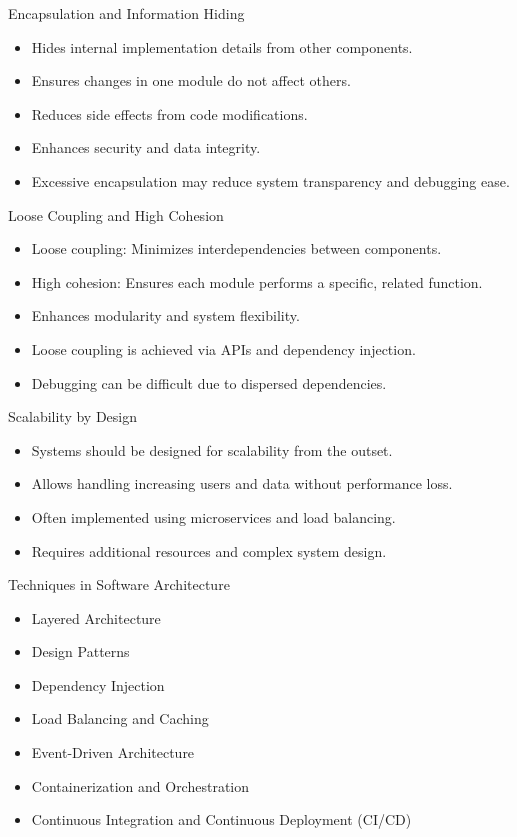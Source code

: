 \documentclass[aspectratio=169, table]{beamer}
\begin{document}
	\begin{frame}{Encapsulation and Information Hiding}
		\begin{itemize}
			\item Hides internal implementation details from other components.
			\item Ensures changes in one module do not affect others.
			\item Reduces side effects from code modifications.
			\item Enhances security and data integrity.
			\item Excessive encapsulation may reduce system transparency and debugging ease.
		\end{itemize}
	\end{frame}
	
	\begin{frame}{Loose Coupling and High Cohesion}
		\begin{itemize}
			\item Loose coupling: Minimizes interdependencies between components.
			\item High cohesion: Ensures each module performs a specific, related function.
			\item Enhances modularity and system flexibility.
			\item Loose coupling is achieved via APIs and dependency injection.
			\item Debugging can be difficult due to dispersed dependencies.
		\end{itemize}
	\end{frame}
	
	\begin{frame}{Scalability by Design}
		\begin{itemize}
			\item Systems should be designed for scalability from the outset.
			\item Allows handling increasing users and data without performance loss.
			\item Often implemented using microservices and load balancing.
			\item Requires additional resources and complex system design.
		\end{itemize}
	\end{frame}
	
	\begin{frame}{Techniques in Software Architecture}
		\begin{itemize}
			\item Layered Architecture
			\item Design Patterns
			\item Dependency Injection
			\item Load Balancing and Caching
			\item Event-Driven Architecture
			\item Containerization and Orchestration
			\item Continuous Integration and Continuous Deployment (CI/CD)
		\end{itemize}
	\end{frame}
	
\end{document}
